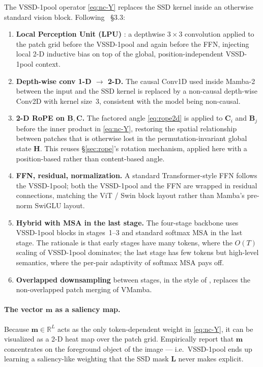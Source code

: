 \documentclass[11pt,a4paper]{article}
\begin{document}
The VSSD-1pool operator \eqref{eq:nc-Y} replaces the SSD kernel inside an
otherwise standard vision block. Following \cite{vssd}~\S 3.3:
\begin{enumerate}
  \item \textbf{Local Perception Unit (LPU)} \cite{vssd}: a depthwise
        $3{\times}3$ convolution applied to the patch grid before the
        VSSD-1pool and again before the FFN, injecting local 2-D
        inductive bias on top of the global, position-independent
        VSSD-1pool context.
  \item \textbf{Depth-wise conv 1-D $\to$ 2-D.} The causal Conv1D
        used inside Mamba-2 between the input and the SSD kernel is
        replaced by a non-causal depth-wise Conv2D with kernel
        size~$3$, consistent with the model being non-causal.
  \item \textbf{2-D RoPE on $\bm{B},\bm{C}$.} The factored angle
        \eqref{eq:rope2d} is applied to $\bm{C}_i$ and $\bm{B}_j$ before
        the inner product in \eqref{eq:nc-Y}, restoring the spatial
        relationship between patches that is otherwise lost in the
        permutation-invariant global state $\bm{H}$. This reuses
        \S\ref{sec:rope}'s rotation mechanism, applied here with a
        position-based rather than content-based angle.
  \item \textbf{FFN, residual, normalization.} A standard
        Transformer-style FFN follows the VSSD-1pool; both the VSSD-1pool and
        the FFN are wrapped in residual connections, matching the
        ViT / Swin block layout rather than Mamba's pre-norm SwiGLU
        layout.
  \item \textbf{Hybrid with MSA in the last stage.} The four-stage
        backbone uses VSSD-1pool blocks in stages~1--3 and standard
        softmax MSA in the last stage. The rationale is that early
        stages have many tokens, where the $O(T)$ scaling of VSSD-1pool
        dominates; the last stage has few tokens but high-level
        semantics, where the per-pair adaptivity of softmax MSA pays
        off.
  \item \textbf{Overlapped downsampling} between stages, in the
        style of \cite{vssd}, replaces the non-overlapped patch
        merging of VMamba.
\end{enumerate}
\paragraph{The vector $\bm{m}$ as a saliency map.} Because $\bm{m}\in
\mathbb{R}^{L}$ acts as the only token-dependent weight in
\eqref{eq:nc-Y}, it can be visualized as a 2-D heat map over the patch
grid. Empirically \cite{vssd} report that $\bm{m}$ concentrates on
the foreground object of the image — i.e.\ VSSD-1pool ends up learning a
saliency-like weighting that the SSD mask $\bm{L}$ never makes
explicit.
\end{document}
